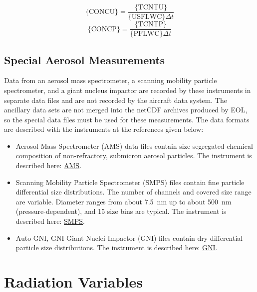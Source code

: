 \documentclass[
  english,
]{book}
\providecommand{\tightlist}{%
  \setlength{\itemsep}{0pt}\setlength{\parskip}{0pt}}
\begin{document}
\begin{equation}
\mathrm{\{CONCU\}}=\frac{\mathrm{\{TCNTU\}}}{\mathrm{\{USFLWC\}}\Delta t}
\label{eq:CONCUbox1}
\end{equation}
\begin{equation}
\mathrm{\{CONCP\}}=\frac{\mathrm{\{TCNTP\}}}{\mathrm{\{PFLWC\}}\Delta t}
\label{eq:CONCUbox2}
\end{equation}

\hypertarget{special-aerosol}{%
\section{Special Aerosol Measurements}\label{special-aerosol}}

Data from an aerosol mass spectrometer, a scanning mobility particle spectrometer, and a giant nucleus impactor are recorded by these instruments in separate data files and are not recorded by the aircraft data system. The ancillary data sets are not merged into the netCDF archives produced by EOL, so the special data files must be used for these measurements. The data formats are described with the instruments at the references given below:

\begin{itemize}
\tightlist
\item
  Aerosol Mass Spectrometer (AMS) data files contain size-segregated chemical composition of non-refractory, submicron aerosol particles. The instrument is described here: \href{https://www.eol.ucar.edu/instruments/time-flight-aerosol-mass-spectrometer}{AMS}.\\
\item
  Scanning Mobility Particle Spectrometer (SMPS) files contain fine particle differential size distributions. The number of channels and covered size range are variable. Diameter ranges from about 7.5~nm up to about 500~nm (pressure-dependent), and 15 size bins are typical. The instrument is described here: \href{https://www.eol.ucar.edu/instruments/scanning-mobility-particle-spectrometer}{SMPS}.\\
\item
  Auto-GNI, GNI Giant Nuclei Impactor (GNI) files contain dry differential particle size distributions. The instrument is described here: \href{https://www.eol.ucar.edu/instruments/giant-nuclei-impactor}{GNI}.
\end{itemize}

\hypertarget{radiation-variables}{%
\chapter{Radiation Variables}\label{radiation-variables}}
\end{document}
